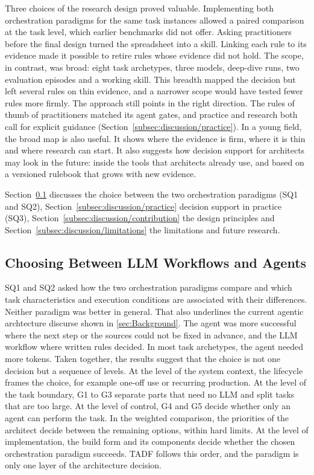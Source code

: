 Three choices of the research design proved valuable. Implementing both orchestration paradigms for the same task instances allowed a paired comparison at the task level, which earlier benchmarks did not offer. Asking practitioners before the final design turned the spreadsheet into a skill. Linking each rule to its evidence made it possible to retire rules whose evidence did not hold. The scope, in contrast, was broad: eight task archetypes, three models, deep-dive runs, two evaluation episodes and a working skill. This breadth mapped the decision but left several rules on thin evidence, and a narrower scope would have tested fewer rules more firmly. The approach still points in the right direction. The rules of thumb of practitioners matched its agent gates, and practice and research both call for explicit guidance (Section~\ref{subsec:discussion/practice}). In a young field, the broad map is also useful. It shows where the evidence is firm, where it is thin and where research can start. It also suggests how decision support for architects may look in the future: inside the tools that architects already use, and based on a versioned rulebook that grows with new evidence.

Section~\ref{subsec:discussion/findings} discusses the choice between the two orchestration paradigms (SQ1 and SQ2), Section~\ref{subsec:discussion/practice} decision support in practice (SQ3), Section~\ref{subsec:discussion/contribution} the design principles and Section~\ref{subsec:discussion/limitations} the limitations and future research.

\subsection{Choosing Between LLM Workflows and Agents}
\label{subsec:discussion/findings}

SQ1 and SQ2 asked how the two orchestration paradigms compare and which task characteristics and execution conditions are associated with their differences. Neither paradigm was better in general. That also underlines the current agentic archtecture discurse shown in \ref{sec:Background}.  The agent was more successful where the next step or the sources could not be fixed in advance, and the LLM workflow where written rules decided. In most task archetypes, the agent needed more tokens. Taken together, the results suggest that the choice is not one decision but a sequence of levels. At the level of the system context, the lifecycle frames the choice, for example one-off use or recurring production. At the level of the task boundary, G1 to G3 separate parts that need no LLM and split tasks that are too large. At the level of control, G4 and G5 decide whether only an agent can perform the task. In the weighted comparison, the priorities of the architect decide between the remaining options, within hard limits. At the level of implementation, the build form and its components decide whether the chosen orchestration paradigm succeeds. TADF follows this order, and the paradigm is only one layer of the architecture decision.

